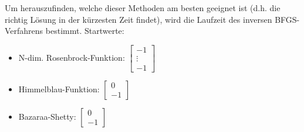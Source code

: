 \documentclass[a4paper, 12pt]{report}
\begin{document}
Um herauszufinden, welche dieser Methoden am besten geeignet ist (d.h. die richtig Lösung in der kürzesten Zeit findet),
wird die Laufzeit des inversen BFGS-Verfahrens bestimmt. Startwerte:

\begin{itemize}
  \item N-dim. Rosenbrock-Funktion: $\begin{bmatrix}-1\\\vdots\\-1\end{bmatrix}$
  \item Himmelblau-Funktion: $\begin{bmatrix}0\\-1\end{bmatrix}$
  \item Bazaraa-Shetty: $\begin{bmatrix}0\\-1\end{bmatrix}$
\end{itemize}
\end{document}
